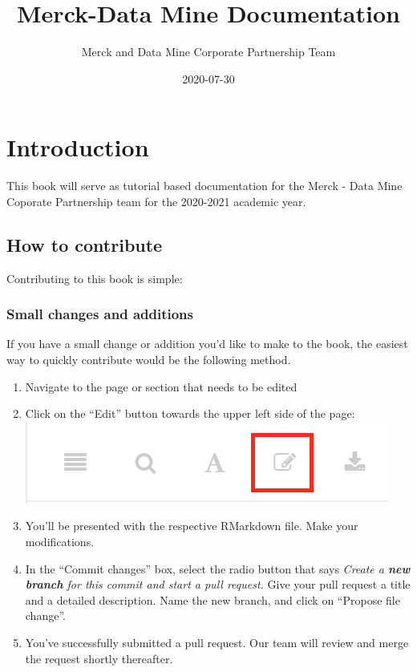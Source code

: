 \documentclass[]{book}
\title{Merck-Data Mine Documentation}
\author{Merck and Data Mine Corporate Partnership Team}
\date{2020-07-30}
\begin{document}
\maketitle

{
\setcounter{tocdepth}{1}
\tableofcontents
}
\chapter{Introduction}\label{introduction}

This book will serve as tutorial based documentation for the Merck -
Data Mine Coporate Partnership team for the 2020-2021 academic year.

\section{How to contribute}\label{how-to-contribute}

Contributing to this book is simple:

\subsection{Small changes and
additions}\label{small-changes-and-additions}

If you have a small change or addition you'd like to make to the book,
the easiest way to quickly contribute would be the following method.

\begin{enumerate}
\def\labelenumi{\arabic{enumi}.}
\item
  Navigate to the page or section that needs to be edited
\item
  Click on the ``Edit'' button towards the upper left side of the page:
  \includegraphics{images/edit_button.png}
\item
  You'll be presented with the respective RMarkdown file. Make your
  modifications.
\item
  In the ``Commit changes'' box, select the radio button that says
  \emph{Create a \textbf{new branch} for this commit and start a pull
  request.} Give your pull request a title and a detailed description.
  Name the new branch, and click on ``Propose file change''.
\item
  You've successfully submitted a pull request. Our team will review and
  merge the request shortly thereafter.
\end{enumerate}
\end{document}
